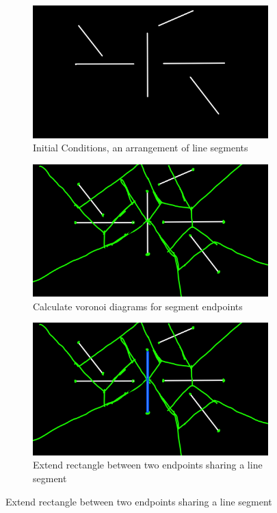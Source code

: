 \documentclass{article}
\begin{document}
\begin{figure}[h!]
	\centering
	
	\begin{subfigure}{0.3\linewidth}
		\includegraphics[width=\linewidth]{Step1.png}
		\caption{Initial Conditions, an arrangement of line segments}
		\label{fig:Step1}
	\end{subfigure}%
	\hfill
	\begin{subfigure}{0.3\linewidth}
		\includegraphics[width=\linewidth]{Step2.png}
		\caption{Calculate voronoi diagrams for segment endpoints}
		\label{fig:Step2}
	\end{subfigure}%
	\hfill
	\begin{subfigure}{0.3\linewidth}
		\includegraphics[width=\linewidth]{Step3.png}
		\caption{Extend rectangle between two endpoints sharing a line segment}
		\label{fig:Step3}
	\end{subfigure}
\end{figure}
\end{document}
